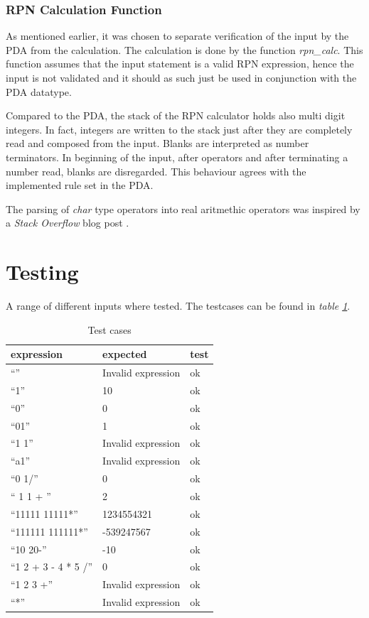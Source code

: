 \documentclass[a4paper,11pt,twoside]{article}
\begin{document}
\subsubsection{RPN Calculation Function}
As mentioned earlier, it was chosen to separate verification of the
input by the PDA from the calculation. The calculation is done by the
function \textit{rpn\_calc}. This function assumes that the input
statement is a valid RPN expression, hence the input is not
validated and it should as such just be used in conjunction with the
PDA datatype.

Compared to the PDA, the stack of the RPN calculator holds also multi
digit integers. In fact, integers are written to the stack just after
they are completely read and composed from the input. Blanks are
interpreted as number terminators. In beginning of the input, after
operators and after terminating a number read, blanks are
disregarded. This behaviour agrees with the implemented rule set in
the PDA. 

The parsing of \textit{char} type operators into real aritmethic
operators was inspired by a \textit{Stack Overflow} blog post \cite{lookup}.

\section{Testing}
A range of different inputs where tested. The testcases can be found
in \textit{table \ref{tab:test}}.

\begin{table}[]
\centering
\caption{Test cases}
\label{tab:test}
\begin{tabular}{lll}
expression          & expected           & test \\ \hline
``''                  & Invalid expression & ok   \\
``1''                 & 10                 & ok   \\
``0''                 & 0                  & ok   \\
``01''                & 1                  & ok   \\
``1 1''               & Invalid expression & ok   \\
``a1''                & Invalid expression & ok   \\
``0 1/''              & 0                  & ok   \\
``   1 1  +  ''       & 2                  & ok   \\
``11111 11111*''      & 1234554321         & ok   \\
``111111 111111*''    & -539247567         & ok   \\
``10 20-''            & -10                & ok   \\
``1 2 + 3 - 4 * 5 /'' & 0                  & ok   \\
``1 2 3 +''           & Invalid expression & ok   \\
``*''                 & Invalid expression & ok  
\end{tabular}
\end{table}
\end{document}
